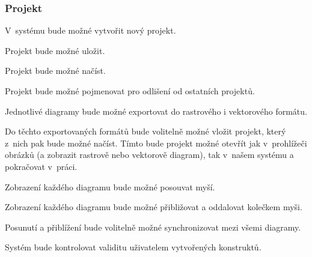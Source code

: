 \subsubsection*{Projekt}
\begin{enumfp}
  \item V~systému bude možné vytvořit nový projekt.
  \item Projekt bude možné uložit.
  \item Projekt bude možné načíst.
  \item Projekt bude možné pojmenovat pro odlišení od ostatních projektů.
  \item Jednotlivé diagramy bude možné exportovat do rastrového i vektorového formátu.
  \item Do těchto exportovaných formátů bude volitelně možné vložit projekt, který z~nich pak bude možné načíst.
  Tímto bude projekt možné otevřít jak v~prohlížeči obrázků (a zobrazit rastrově nebo vektorově diagram), tak v~našem systému a pokračovat v~práci.
  \item Zobrazení každého diagramu bude možné posouvat myší.
  \item Zobrazení každého diagramu bude možné přibližovat a oddalovat kolečkem myši.
  \item Posunutí a přiblížení bude volitelně možné synchronizovat mezi všemi diagramy.
  \item Systém bude kontrolovat validitu uživatelem vytvořených konstruktů.
\end{enumfp}

